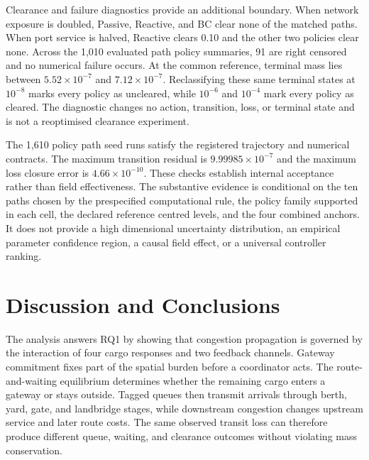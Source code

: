 \documentclass[a4paper,fleqn]{cas-sc}
\begin{document}
Clearance and failure diagnostics provide an additional boundary. When network
exposure is doubled, Passive, Reactive, and BC clear none of the matched paths.
When port service is halved, Reactive clears 0.10 and the other two policies
clear none. Across the 1,010 evaluated path policy summaries, 91 are right
censored and no numerical failure occurs. At the common reference, terminal
mass lies between $5.52\times10^{-7}$ and $7.12\times10^{-7}$. Reclassifying
these same terminal states at $10^{-8}$ marks every policy as uncleared, while
$10^{-6}$ and $10^{-4}$ mark every policy as cleared. The diagnostic changes no
action, transition, loss, or terminal state and is not a reoptimised clearance
experiment.

The 1,610 policy path seed runs satisfy the registered trajectory and numerical
contracts. The maximum transition residual is $9.99985\times10^{-7}$ and the
maximum loss closure error is $4.66\times10^{-10}$. These checks establish
internal acceptance rather than field effectiveness. The substantive evidence
is conditional on the ten paths chosen by the prespecified computational rule,
the policy family supported in each cell, the declared reference centred
levels, and the four combined anchors. It does not provide a high dimensional
uncertainty distribution, an empirical parameter confidence region, a causal
field effect, or a universal controller ranking.

\FloatBarrier
\section{Discussion and Conclusions}
\label{sec:discussion-conclusions}

The analysis answers RQ1 by showing that congestion propagation is governed by
the interaction of four cargo responses and two feedback channels. Gateway
commitment fixes part of the spatial burden before a coordinator acts. The
route-and-waiting equilibrium determines whether the remaining cargo enters a
gateway or stays outside. Tagged queues then transmit arrivals through berth,
yard, gate, and landbridge stages, while downstream congestion changes upstream
service and later route costs. The same observed transit loss can therefore
produce different queue, waiting, and clearance outcomes without violating mass
conservation.
\end{document}
